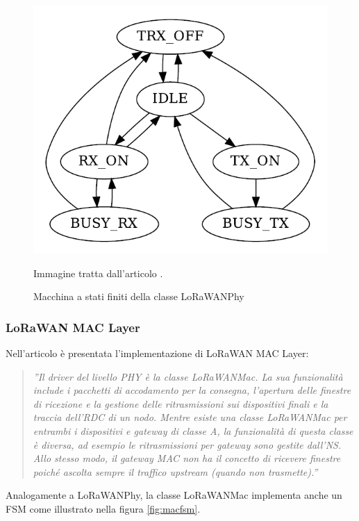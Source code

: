 \documentclass[a4paper]{report} %
\begin{document}
\begin{figure}
\centering
\includegraphics[scale=.5]{Immagini/MSFLoRaWAN.png}
\caption{Macchina a stati finiti della classe LoRaWANPhy}
\label{fig:phyfsm}
Immagine tratta dall'articolo \cite{art:rif.49}. \\
\end{figure}

\subsubsection{LoRaWAN MAC Layer} 
Nell'articolo \cite{art:rif.49} è presentata l'implementazione di LoRaWAN MAC Layer:
\begin{quote}
	\textit{''Il driver del livello PHY è la classe LoRaWANMac. La sua funzionalità include i pacchetti di accodamento per la consegna, l'apertura delle finestre di ricezione e la gestione delle ritrasmissioni sui dispositivi finali e la traccia dell'RDC di un nodo. Mentre esiste una classe LoRaWANMac per entrambi i dispositivi e gateway di classe A, la funzionalità di questa classe è diversa, ad esempio le ritrasmissioni per gateway sono gestite dall'NS. Allo stesso modo, il gateway MAC non ha il concetto di ricevere finestre poiché ascolta sempre il traffico upstream (quando non trasmette).''}
\end{quote}
Analogamente a LoRaWANPhy, la classe LoRaWANMac implementa anche un FSM come illustrato nella figura \ref{fig:macfsm}. 
\end{document}
